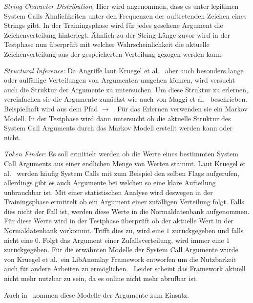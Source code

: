             \textit{String Character Distribution}: Hier wird angenommen, dass es unter legitimen System Calls Ähnlichkeiten unter den Frequenzen der auftretenden Zeichen eines Strings gibt.
            In der Trainingsphase wird für jedes gesehene Argument die Zeichenverteilung hinterlegt.
            Ähnlich zu der String-Länge zuvor wird in der Testphase nun überprüft mit welcher Wahrscheinlichkeit die aktuelle Zeichenverteilung aus der gespeicherten Verteilung gezogen werden kann.

            \textit{Structural Inference:} Da Angriffe laut Kruegel et al.~\cite{ARGUMENTS} aber auch besonders lange oder auffällige Verteilungen von Argumenten umgehen können, wird versucht auch die Struktur der Argumente zu untersuchen.
            Um diese Struktur zu erlernen, vereinfachen sie die Argumente zunächst wie auch von Maggi et al.~\cite{ARGUMENTS2} beschrieben.
            Beispielhaft wird aus dem Pfad  $\longrightarrow$ .
            Für das Erlernen verwenden sie ein Markov Modell.
            In der Testphase wird dann untersucht ob die aktuelle Struktur des System Call Arguments durch das Markov Modell erstellt werden kann oder nicht.

            \textit{Token Finder}: Es soll ermittelt werden ob die Werte eines bestimmten System Call Arguments aus einer endlichen Menge von Werten stammt.
            Laut Kruegel et al.~\cite{ARGUMENTS} werden häufig System Calls mit zum Beispiel den selben Flags aufgerufen, allerdings gibt es auch Argumente bei welchen so eine klare Aufteilung unbrauchbar ist.
            Mit einer statistischen Analyse wird deswegen in der Trainingsphase ermittelt ob ein Argument einer zufälligen Verteilung folgt.
            Falls dies nicht der Fall ist, werden diese Werte in die Normaldatenbank aufgenommen.
            Für diese Werte wird in der Testphase überprüft ob der aktuelle Wert in der Normaldatenbank vorkommt.
            Trifft dies zu, wird eine $1$ zurückgegeben und falls nicht eine $0$.
            Folgt das Argument einer Zufallsverteilung, wird immer eine $1$ zurückgegeben.
            Für die erwähnten Modelle der System Call Argumente wurde von Kruegel et al.\ ein LibAnomlay Framework entworfen um die Nutzbarkeit auch für andere Arbeiten zu ermöglichen.~\cite{ARGUMENTS}
            Leider scheint das Framework aktuell nicht mehr nutzbar zu sein, da es online nicht mehr abrufbar ist.

            Auch in~\cite{ARGUMENTS2} kommen diese Modelle der Argumente zum Einsatz.
            
